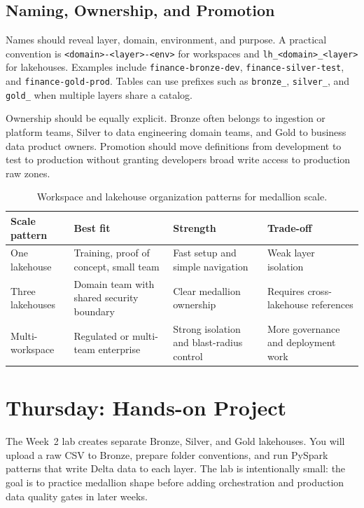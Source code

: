 \subsection{Naming, Ownership, and Promotion}
Names should reveal layer, domain, environment, and purpose. A practical convention is \texttt{<domain>-<layer>-<env>} for workspaces and \texttt{lh\_<domain>\_<layer>} for lakehouses. Examples include \texttt{finance-bronze-dev}, \texttt{finance-silver-test}, and \texttt{finance-gold-prod}. Tables can use prefixes such as \texttt{bronze\_}, \texttt{silver\_}, and \texttt{gold\_} when multiple layers share a catalog.

Ownership should be equally explicit. Bronze often belongs to ingestion or platform teams, Silver to data engineering domain teams, and Gold to business data product owners. Promotion should move definitions from development to test to production without granting developers broad write access to production raw zones.

\begin{table}[H]
\centering
\small
\begin{tabular}{@{}p{3.1cm}p{4.0cm}p{3.7cm}p{3.2cm}@{}}
\toprule
\textbf{Scale pattern} & \textbf{Best fit} & \textbf{Strength} & \textbf{Trade-off} \\
\midrule
One lakehouse & Training, proof of concept, small team & Fast setup and simple navigation & Weak layer isolation \\
Three lakehouses & Domain team with shared security boundary & Clear medallion ownership & Requires cross-lakehouse references \\
Multi-workspace & Regulated or multi-team enterprise & Strong isolation and blast-radius control & More governance and deployment work \\
\bottomrule
\end{tabular}
\caption{Workspace and lakehouse organization patterns for medallion scale.}
\label{tab:chapter2-workspace-patterns}
\end{table}

\section{Thursday: Hands-on Project}
The Week~2 lab creates separate Bronze, Silver, and Gold lakehouses. You will upload a raw CSV to Bronze, prepare folder conventions, and run PySpark patterns that write Delta data to each layer. The lab is intentionally small: the goal is to practice medallion shape before adding orchestration and production data quality gates in later weeks.

